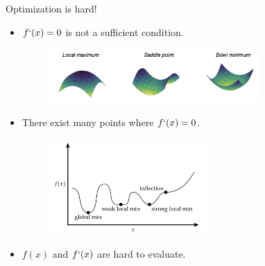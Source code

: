 \documentclass{beamer}
\begin{document}
\begin{frame}{Optimization is hard!}
\begin{itemize}
    \item $f`(x)=0$ is not a sufficient condition.
\begin{figure}
\centering
\includegraphics[width=80mm]{Figs/minimum.jpeg}
\end{figure}
    \item There exist many points where {$f`(x)=0$}.
\begin{figure}
\centering
\includegraphics[width=60mm]{Figs/multi-minima.jpeg}
\end{figure}
    \item $f(x)$ and $f`(x)$ are hard to evaluate.

\end{itemize}
\end{frame}
\end{document}
